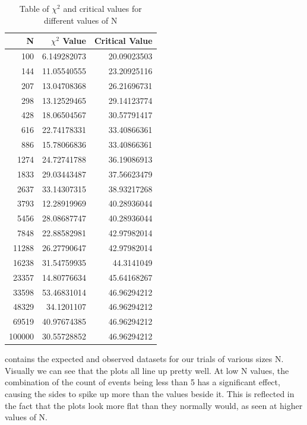 \documentclass[a4paper, 12pt]{article}
\begin{document}
            \begin{table}
                \centering
                \begin{tabular}{r|r|r}
                    \textbf{N} & \textbf{$\chi^2$ Value} & \textbf{Critical Value} \\
                    \hline
                    100 & 6.149282073 & 20.09023503 \\
                    144 & 11.05540555 & 23.20925116 \\
                    207 & 13.04708368 & 26.21696731 \\
                    298 & 13.12529465 & 29.14123774 \\
                    428 & 18.06504567 & 30.57791417 \\
                    616 & 22.74178331 & 33.40866361 \\
                    886 & 15.78066836 & 33.40866361 \\
                    1274 & 24.72741788 & 36.19086913 \\
                    1833 & 29.03443487 & 37.56623479 \\
                    2637 & 33.14307315 & 38.93217268 \\
                    3793 & 12.28919969 & 40.28936044 \\
                    5456 & 28.08687747 & 40.28936044 \\
                    7848 & 22.88582981 & 42.97982014 \\
                    11288 & 26.27790647 & 42.97982014 \\
                    16238 & 31.54759935 & 44.3141049 \\
                    23357 & 14.80776634 & 45.64168267 \\
                    33598 & 53.46831014 & 46.96294212 \\
                    48329 & 34.1201107 & 46.96294212 \\
                    69519 & 40.97674385 & 46.96294212 \\
                    100000 & 30.55728852 & 46.96294212 \\
                \end{tabular}
                \caption{Table of $\chi^2$ and critical values for different values of N}
                \label{tab:values}
            \end{table}
             contains the expected and observed datasets for our trials of various sizes N. Visually we can see that the plots all line up pretty well. At low N values, the combination of the count of events being less than 5 has a significant effect, causing the sides to spike up more than the values beside it. This is reflected in the fact that the plots look more flat than they normally would, as seen at higher values of N.
\end{document}
